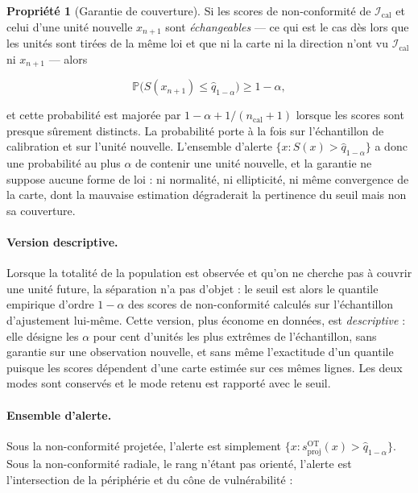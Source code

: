 \documentclass[11pt,a4paper]{article}
\theoremstyle{definition}
\newtheorem{propriete}{Propriété}[section]
\theoremstyle{remark}
\newcommand{\PP}{\mathbb{P}}
\begin{document}
\begin{propriete}[Garantie de couverture]
  \label{prop:conforme}
  Si les scores de non-conformité de $\mathcal{I}_{\mathrm{cal}}$ et celui d'une unité
  nouvelle $x_{n+1}$ sont \emph{échangeables} --- ce qui est le cas dès lors que les unités
  sont tirées de la même loi et que ni la carte ni la direction n'ont vu
  $\mathcal{I}_{\mathrm{cal}}$ ni $x_{n+1}$ --- alors

  \medskip

  \[
    \PP\big(S(x_{n+1}) \le \hat{q}_{1-\alpha}\big) \ge 1-\alpha,
  \]

  \bigskip

  et cette probabilité est majorée par $1 - \alpha + 1/(n_{\mathrm{cal}}+1)$ lorsque les
  scores sont presque sûrement distincts. La probabilité porte à la fois sur l'échantillon
  de calibration et sur l'unité nouvelle. L'ensemble d'alerte
  $\{x : S(x) > \hat{q}_{1-\alpha}\}$ a donc une probabilité au plus $\alpha$ de contenir
  une unité nouvelle, et la garantie ne suppose aucune forme de loi : ni normalité, ni
  ellipticité, ni même convergence de la carte, dont la mauvaise estimation dégraderait la
  pertinence du seuil mais non sa couverture.
\end{propriete}

\bigskip

\paragraph{Version descriptive.} Lorsque la totalité de la population est observée et qu'on
ne cherche pas à couvrir une unité future, la séparation n'a pas d'objet : le seuil est
alors le quantile empirique d'ordre $1-\alpha$ des scores de non-conformité calculés sur
l'échantillon d'ajustement lui-même. Cette version, plus économe en données, est
\emph{descriptive} : elle désigne les $\alpha$ pour cent d'unités les plus extrêmes de
l'échantillon, sans garantie sur une observation nouvelle, et sans même l'exactitude d'un
quantile puisque les scores dépendent d'une carte estimée sur ces mêmes lignes. Les deux
modes sont conservés et le mode retenu est rapporté avec le seuil.

\medskip

\paragraph{Ensemble d'alerte.} Sous la non-conformité projetée, l'alerte est simplement
$\{x : s^{\mathrm{OT}}_{\mathrm{proj}}(x) > \hat{q}_{1-\alpha}\}$. Sous la non-conformité
radiale, le rang n'étant pas orienté, l'alerte est l'intersection de la périphérie et du
cône de vulnérabilité :
\end{document}
